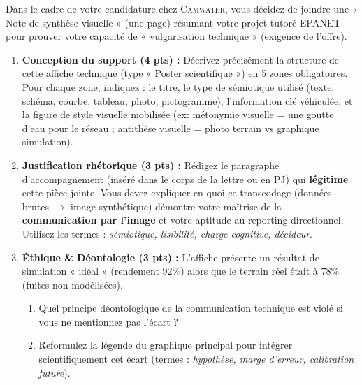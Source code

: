 \documentclass[11pt]{article}
\begin{document}
\begin{exercice}
Dans le cadre de votre candidature chez \textsc{Camwater}, vous décidez de joindre une « Note de synthèse visuelle » (une page) résumant votre projet tutoré EPANET pour prouver votre capacité de « vulgarisation technique » (exigence de l'offre).

\begin{enumerate}
    \item \textbf{Conception du support (4 pts) :} Décrivez précisément la structure de cette affiche technique (type « Poster scientifique ») en 5 zones obligatoires. Pour chaque zone, indiquez : le titre, le type de sémiotique utilisé (texte, schéma, courbe, tableau, photo, pictogramme), l'information clé véhiculée, et la figure de style visuelle mobilisée (ex: métonymie visuelle = une goutte d'eau pour le réseau ; antithèse visuelle = photo terrain vs graphique simulation).
    \item \textbf{Justification rhétorique (3 pts) :} Rédigez le paragraphe d'accompagnement (inséré dans le corps de la lettre ou en PJ) qui \textbf{légitime} cette pièce jointe. Vous devez expliquer en quoi ce transcodage (données brutes $\rightarrow$ image synthétique) démontre votre maîtrise de la \textbf{communication par l'image} et votre aptitude au reporting directionnel. Utilisez les termes : \textit{sémiotique, lisibilité, charge cognitive, décideur}.
    \item \textbf{Éthique \& Déontologie (3 pts) :} L'affiche présente un résultat de simulation « idéal » (rendement 92\%) alors que le terrain réel était à 78\% (fuites non modélisées). 
    \begin{enumerate}
        \item Quel principe déontologique de la communication technique est violé si vous ne mentionnez pas l'écart ?
        \item Reformulez la légende du graphique principal pour intégrer scientifiquement cet écart (termes : \textit{hypothèse, marge d'erreur, calibration future}).
    \end{enumerate}
\end{enumerate}
\end{exercice}
\end{document}

